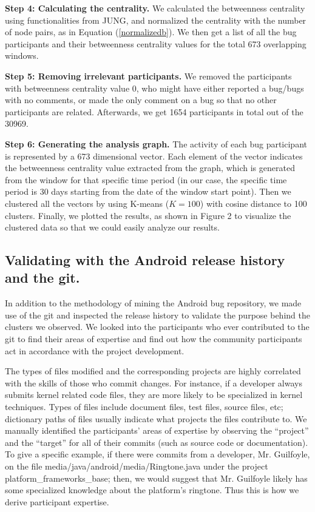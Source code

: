 \documentclass[conference]{IEEEtran}
\begin{document}
\textbf{Step 4: Calculating the centrality.} We calculated the
betweenness centrality using functionalities from JUNG, and normalized the centrality with the number of node pairs, as in Equation (\ref{normalizedb}). We then get a list of all the bug participants and
their betweenness centrality values for the total 673 overlapping
windows.


\textbf{Step 5: Removing irrelevant participants.} We removed the
participants with betweenness centrality value 0, who might have
either reported a bug/bugs with no comments, or made the only comment
on a bug so that no other participants are related. Afterwards, we get
1654 participants in total out of the 30969.


\textbf{Step 6: Generating the analysis graph.} The activity
of each bug participant is represented by a 673 dimensional vector. Each element of the vector indicates the betweenness centrality value extracted
from the graph, which is generated from the window for that
specific time period (in our case, the specific time period is 30 days
starting from the date of the window start point). Then we clustered
all the vectors by using K-means ($K=100$) with cosine distance to 100
clusters. Finally, we plotted the results, as shown in Figure 2 to
visualize the clustered data so that we could easily analyze
our results.


\subsection{Validating with the Android release history and the git.} 
In addition to the methodology of mining the Android
bug repository, we made use of the git and
inspected the release history to validate the purpose behind the
clusters we observed.
We looked into the participants who ever contributed to the git to find their areas of expertise and find out how the community participants
act in accordance with the project development.

The types of files modified and the corresponding projects are highly
correlated with the skills of those who commit changes. For
instance, if a developer always submits kernel related code
files, they are more likely to be specialized in kernel techniques. Types of files
include document files, test files, source files, etc; dictionary paths of files usually indicate what projects the files contribute to. 
We manually identified the participants' areas of expertise by
observing the ``project'' and the
``target'' for all of their commits (such as source code or
documentation).
To give a specific example, if there were commits from a developer,
Mr. Guilfoyle, on the file
media/java/android/media/Ringtone.java under the project
platform\_frameworks\_base; then, we would suggest that Mr. Guilfoyle 
likely has some specialized knowledge about the platform's ringtone. 
Thus this is how we derive participant expertise.
\end{document}
